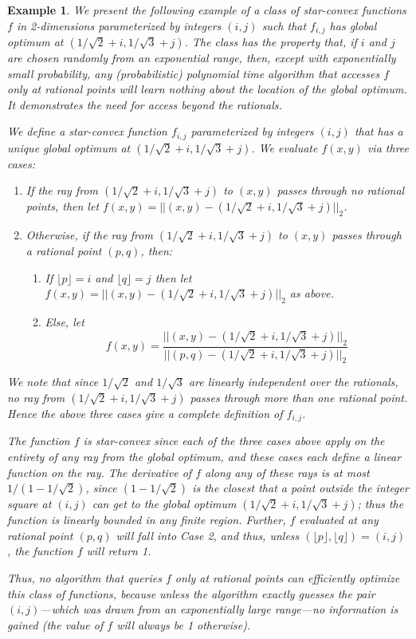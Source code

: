 \documentclass[11pt,letter]{article}
\newcounter{nTheorems}
\numberwithin{nTheorems}{section}
\newtheorem{example}[nTheorems]{Example}
\begin{document}
\begin{example}\label{ex:rationals}
We present the following example of a class of star-convex functions $f$ in 2-dimensions parameterized by integers $(i,j)$ such that $f_{i,j}$ has global optimum at $(1/\sqrt{2}+i,1/\sqrt{3}+j)$.
The class has the property that, if $i$ and $j$ are chosen randomly from an exponential range, then, except with exponentially small probability, any (probabilistic) polynomial time algorithm that accesses $f$ only at rational points will learn nothing about the location of the global optimum.
It demonstrates the need for access beyond the rationals.


We define a star-convex function $f_{i,j}$ parameterized by integers $(i,j)$ that has a unique global optimum at $(1/\sqrt{2}+i,1/\sqrt{3}+j)$.
We evaluate $f(x,y)$ via three cases:
\begin{enumerate}
  \item If the ray from $(1/\sqrt{2}+i,1/\sqrt{3}+j)$ to $(x,y)$ passes through no rational points, then let $f(x,y)=||(x,y)-(1/\sqrt{2}+i,1/\sqrt{3}+j)||_2$.
  \item Otherwise, if the ray from $(1/\sqrt{2}+i,1/\sqrt{3}+j)$ to $(x,y)$ passes through a rational point $(p,q)$, then:
    \begin{enumerate}
    \item If $\lfloor p\rfloor=i$ and $\lfloor q\rfloor=j$ then let $f(x,y)=||(x,y)-(1/\sqrt{2}+i,1/\sqrt{3}+j)||_2$ as above.
    \item Else, let $$f(x,y)=\frac{||(x,y)-(1/\sqrt{2}+i,1/\sqrt{3}+j)||_2}{||(p,q)-(1/\sqrt{2}+i,1/\sqrt{3}+j)||_2}$$
  \end{enumerate}
\end{enumerate}
We note that since $1/\sqrt{2}$ and $1/\sqrt{3}$ are linearly independent over the rationals, no ray from $(1/\sqrt{2}+i,1/\sqrt{3}+j)$ passes through more than one rational point.
Hence the above three cases give a complete definition of $f_{i,j}$.

The function $f$ is star-convex since each of the three cases above apply on the entirety of any ray from the global optimum, and these cases each define a linear function on the ray.
The derivative of $f$ along any of these rays is at most $1/(1-1/\sqrt{2})$, since $(1-1/\sqrt{2})$ is the closest that a point outside the integer square at $(i,j)$ can get to the global optimum $(1/\sqrt{2}+i,1/\sqrt{3}+j)$; thus the function is linearly bounded in any finite region.
Further, $f$ evaluated at any \emph{rational} point $(p,q)$ will fall into Case 2, and thus, unless $(\lfloor p\rfloor,\lfloor q\rfloor)=(i,j)$, the function $f$ will return 1.

Thus, no algorithm that queries $f$ only at rational points can efficiently optimize this class of functions, because unless the algorithm \emph{exactly} guesses the pair $(i,j)$---which was drawn from an exponentially large range---no information is gained (the value of $f$ will always be 1 otherwise).
\end{example}
\end{document}
